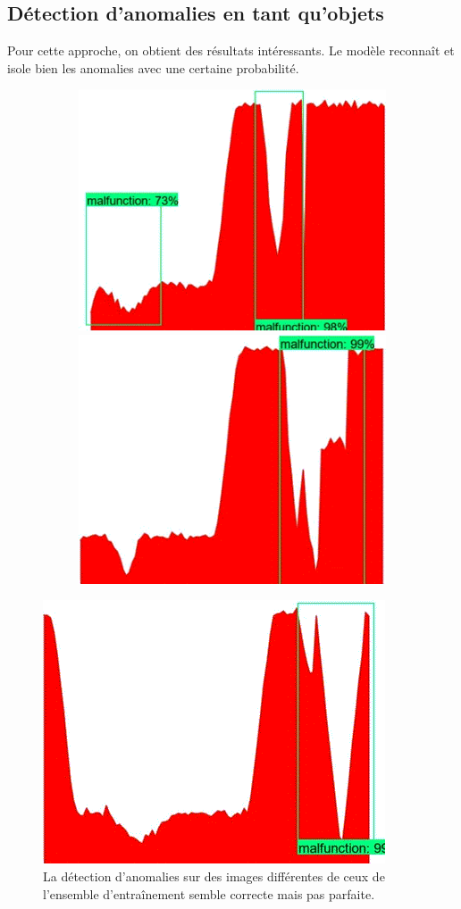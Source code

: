 \documentclass[french]{article}
\theoremstyle{mytheoremstyle}
\theoremstyle{mytheoremstyle}
\theoremstyle{myproblemstyle}
\begin{document}
    \subsection{Détection d'anomalies en tant qu'objets}
    Pour cette approche, on obtient des résultats intéressants. Le modèle reconnaît et isole bien les anomalies avec une certaine probabilité.
    \begin{figure}[H]
        \centering
        \begin{subfigure}{\linewidth}
            \includegraphics[width=.5\textwidth]{images/od_1.png}
            \hfill
            \includegraphics[width=.5\textwidth]{images/od_2.png}
        \end{subfigure}
    \end{figure}
    \begin{figure}[H]
        \centering
        \includegraphics[width=.5\textwidth]{images/od_3.png}
        \caption{La détection d'anomalies sur des images différentes de ceux de l'ensemble d'entraînement semble correcte mais pas parfaite.}
        \label{}
    \end{figure}
\end{document}
